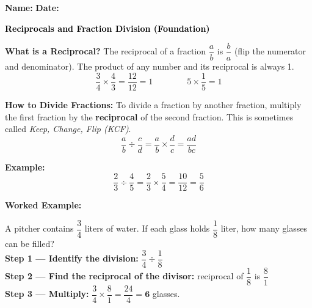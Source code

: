 \documentclass[12pt, letterpaper, fleql]{article}
\begin{document}
\textbf{Name:} \underline{\hspace{5cm}}
\hfill
\textbf{Date:} \underline{\hspace{3cm}}\\

\begin{tcolorbox}[colback=black!10]
    \large\textcolor{black}{\textbf{Reciprocals and Fraction Division (Foundation)}}
\end{tcolorbox}

\vspace{3mm}

\noindent
\textbf{What is a Reciprocal?} The reciprocal of a fraction $\dfrac{a}{b}$ is $\dfrac{b}{a}$ (flip the numerator and denominator). The product of any number and its reciprocal is always 1.
$$\frac{3}{4} \times \frac{4}{3} = \frac{12}{12} = 1 \qquad \qquad 5 \times \frac{1}{5} = 1$$

\vspace{3mm}

\noindent
\textbf{How to Divide Fractions:} To divide a fraction by another fraction, multiply the first fraction by the \textbf{reciprocal} of the second fraction. This is sometimes called \textit{Keep, Change, Flip (KCF)}.
$$\frac{a}{b} \div \frac{c}{d} = \frac{a}{b} \times \frac{d}{c} = \frac{ad}{bc}$$

\noindent
\textbf{Example:}
$$\frac{2}{3} \div \frac{4}{5} = \frac{2}{3} \times \frac{5}{4} = \frac{10}{12} = \frac{5}{6}$$

\vspace{4mm}

\begin{tcolorbox}[colback=white, colframe=black!25, boxrule=0.6pt, arc=4mm, left=6mm, right=6mm, top=5mm, bottom=5mm]
\textbf{Worked Example:}

\medskip
\noindent
A pitcher contains $\dfrac{3}{4}$ liters of water. If each glass holds $\dfrac{1}{8}$ liter, how many glasses can be filled?\\[4pt]
\textbf{Step 1 — Identify the division:} $\dfrac{3}{4} \div \dfrac{1}{8}$\\[6pt]
\textbf{Step 2 — Find the reciprocal of the divisor:} reciprocal of $\dfrac{1}{8}$ is $\dfrac{8}{1}$\\[6pt]
\textbf{Step 3 — Multiply:} $\dfrac{3}{4} \times \dfrac{8}{1} = \dfrac{24}{4} = \mathbf{6}$ glasses.
\end{tcolorbox}
\end{document}
